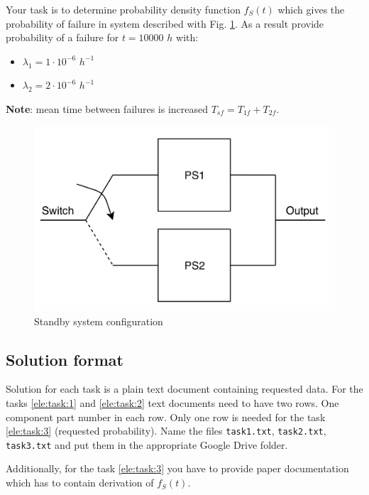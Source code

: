 \documentclass[openany]{book}
\begin{document}
	Your task is to determine probability density function $f_S(t)$ which gives 
	the
	probability of failure in system described with Fig. \ref{fig:psc}. As a 
	result 
	provide probability of a failure for $t = 10000$ $h$ with:
	\begin{itemize}
		\item[] $\lambda_1 = 1 \cdot10^{-6}$ $h^{-1}$
		\item[] $\lambda_2 = 2 \cdot10^{-6}$ $h^{-1}$ 
	\end{itemize} 
	
	\textbf{Note}: mean time between failures is increased $T_{sf} = 
	T_{1f} + T_{2f}$. 
	
	\begin{figure}[h!]
		\centering
		\includegraphics[width=\linewidth]{standby.png}
		\caption{Standby system configuration}
		\label{fig:psc}
	\end{figure}
	
	\newpage
	
	\subsection{Solution format}
	Solution for each task is a plain text document containing requested data. 
	For
	the tasks \ref{ele:task:1} and \ref{ele:task:2} text documents need to have 
	two rows. One component part number in each row. Only one row is needed for 
	the 
	task \ref{ele:task:3} (requested probability). Name the files 
	\texttt{task1.txt}, \texttt{task2.txt}, \texttt{task3.txt} and put them in 
	the appropriate Google Drive folder.
	
	Additionally, for the task \ref{ele:task:3} you have to provide paper 
	documentation which has to contain derivation of $f_S(t)$.
	
\end{document}
